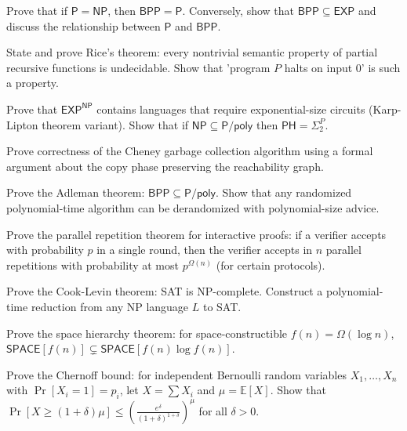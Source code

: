 \documentclass[12pt,a4paper]{exam}
\begin{document}
\begin{questions}
\vspace{0.3cm}

\question[6]
Prove that if $\mathsf{P} = \mathsf{NP}$, then $\mathsf{BPP} = \mathsf{P}$. Conversely, show that $\mathsf{BPP} \subseteq \mathsf{EXP}$ and discuss the relationship between $\mathsf{P}$ and $\mathsf{BPP}$.

\vspace{0.3cm}

\question[3]
State and prove Rice's theorem: every nontrivial semantic property of partial recursive functions is undecidable. Show that 'program $P$ halts on input 0' is such a property.

\vspace{0.3cm}

\question[3]
Prove that $\mathsf{EXP}^{\mathsf{NP}}$ contains languages that require exponential-size circuits (Karp-Lipton theorem variant). Show that if $\mathsf{NP} \subseteq \mathsf{P}/\mathsf{poly}$ then $\mathsf{PH} = \Sigma_2^P$.

\vspace{0.3cm}

\question[4]
Prove correctness of the Cheney garbage collection algorithm using a formal argument about the copy phase preserving the reachability graph.

\vspace{0.3cm}

\question[3]
Prove the Adleman theorem: $\mathsf{BPP} \subseteq \mathsf{P}/\mathsf{poly}$. Show that any randomized polynomial-time algorithm can be derandomized with polynomial-size advice.

\vspace{0.3cm}

\question[4]
Prove the parallel repetition theorem for interactive proofs: if a verifier accepts with probability $p$ in a single round, then the verifier accepts in $n$ parallel repetitions with probability at most $p^{\Omega(n)}$ (for certain protocols).

\vspace{0.3cm}

\question[2]
Prove the Cook-Levin theorem: SAT is NP-complete. Construct a polynomial-time reduction from any NP language $L$ to SAT.

\vspace{0.3cm}

\question[7]
Prove the space hierarchy theorem: for space-constructible $f(n) = \Omega(\log n)$, $\mathsf{SPACE}[f(n)] \subsetneq \mathsf{SPACE}[f(n) \log f(n)]$.

\vspace{0.3cm}

\question[4]
Prove the Chernoff bound: for independent Bernoulli random variables $X_1,\ldots,X_n$ with $\Pr[X_i = 1] = p_i$, let $X = \sum X_i$ and $\mu = \mathbb{E}[X]$. Show that $\Pr[X \geq (1+\delta)\mu] \leq (\frac{e^\delta}{(1+\delta)^{1+\delta}})^\mu$ for all $\delta > 0$.

\vspace{0.3cm}

\end{questions}
\end{document}
